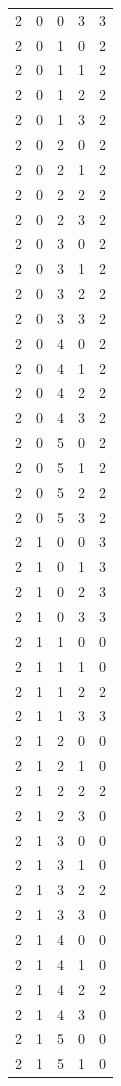 \begin{longtable}{rrrrr}
2 & 0 & 0 & 3 & 3 \\
2 & 0 & 1 & 0 & 2 \\
2 & 0 & 1 & 1 & 2 \\
2 & 0 & 1 & 2 & 2 \\
2 & 0 & 1 & 3 & 2 \\
2 & 0 & 2 & 0 & 2 \\
2 & 0 & 2 & 1 & 2 \\
2 & 0 & 2 & 2 & 2 \\
2 & 0 & 2 & 3 & 2 \\
2 & 0 & 3 & 0 & 2 \\
2 & 0 & 3 & 1 & 2 \\
2 & 0 & 3 & 2 & 2 \\
2 & 0 & 3 & 3 & 2 \\
2 & 0 & 4 & 0 & 2 \\
2 & 0 & 4 & 1 & 2 \\
2 & 0 & 4 & 2 & 2 \\
2 & 0 & 4 & 3 & 2 \\
2 & 0 & 5 & 0 & 2 \\
2 & 0 & 5 & 1 & 2 \\
2 & 0 & 5 & 2 & 2 \\
2 & 0 & 5 & 3 & 2 \\
2 & 1 & 0 & 0 & 3 \\
2 & 1 & 0 & 1 & 3 \\
2 & 1 & 0 & 2 & 3 \\
2 & 1 & 0 & 3 & 3 \\
2 & 1 & 1 & 0 & 0 \\
2 & 1 & 1 & 1 & 0 \\
2 & 1 & 1 & 2 & 2 \\
2 & 1 & 1 & 3 & 3 \\
2 & 1 & 2 & 0 & 0 \\
2 & 1 & 2 & 1 & 0 \\
2 & 1 & 2 & 2 & 2 \\
2 & 1 & 2 & 3 & 0 \\
2 & 1 & 3 & 0 & 0 \\
2 & 1 & 3 & 1 & 0 \\
2 & 1 & 3 & 2 & 2 \\
2 & 1 & 3 & 3 & 0 \\
2 & 1 & 4 & 0 & 0 \\
2 & 1 & 4 & 1 & 0 \\
2 & 1 & 4 & 2 & 2 \\
2 & 1 & 4 & 3 & 0 \\
2 & 1 & 5 & 0 & 0 \\
2 & 1 & 5 & 1 & 0 \\

\end{longtable}
